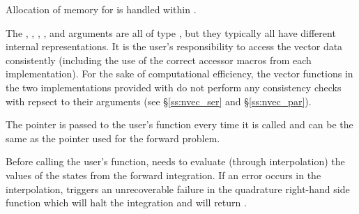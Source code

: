 {
  Allocation of memory for  is handled within {\idas}.

  The , , , , and  arguments are all 
  of type , but they typically all have 
  different internal representations. It is the user's 
  responsibility to access the vector data consistently (including the use of the 
  correct accessor macros from each {\nvector} implementation). For the sake of 
  computational efficiency, the vector functions in the two {\nvector} implementations 
  provided with {\idas} do not perform any consistency checks with repsect to their 
   arguments (see \S\ref{ss:nvec_ser} and \S\ref{ss:nvec_par}).

  The  pointer is passed to the user's  function every time 
  it is called and can be the same as the  pointer used for the forward problem.

  {\warn}Before calling the user's  function, {\idas} needs to evaluate
  (through interpolation) the values of the states from the forward integration. 
  If an error occurs in the interpolation, {\idas} triggers an unrecoverable
  failure in the quadrature right-hand side function which will halt the integration and
   will return .
}

